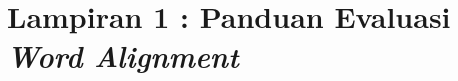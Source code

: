 
\begin{comment}
	\addChapter{Lampiran 1 : Panduan Evaluasi \textit{Word Alignment}}
\end{comment}

\chapter*{Lampiran 1 : Panduan Evaluasi \textit{Word Alignment}}

